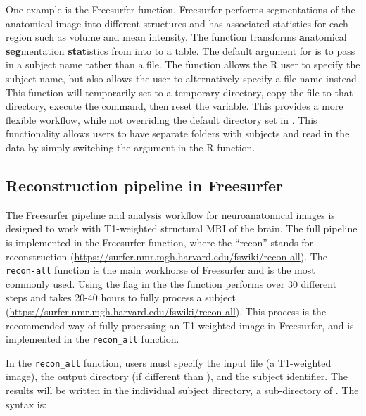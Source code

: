 One example is the  Freesurfer function.
Freesurfer performs segmentations of the anatomical image into different
structures and has associated statistics for each region such as volume
and mean intensity. The  function transforms
\textbf{a}natomical \textbf{seg}mentation \textbf{stat}istics from into
to a table. The default argument for  is to pass
in a subject name rather than a file. The 
 function allows the R user to specify the subject
name, but also allows the user to alternatively specify a file name
instead. This function will temporarily set  to a
temporary directory, copy the file to that directory, execute the
command, then reset the  variable. This provides a
more flexible workflow, while not overriding the default directory set
in . This functionality allows users to have
separate folders with subjects and read in the data by simply switching
the  argument in the R function.

\subsection{Reconstruction pipeline in
Freesurfer}\label{reconstruction-pipeline-in-freesurfer}

The Freesurfer pipeline and analysis workflow for neuroanatomical images
is designed to work with T1-weighted structural MRI of the brain. The
full pipeline is implemented in the Freesurfer 
function, where the ``recon'' stands for reconstruction
(\url{https://surfer.nmr.mgh.harvard.edu/fswiki/recon-all}). The
\texttt{recon-all} function is the main workhorse of Freesurfer and is
the most commonly used. Using the  flag in the the
 function performs over 30 different steps and takes
20-40 hours to fully process a subject
(\url{https://surfer.nmr.mgh.harvard.edu/fswiki/recon-all}). This
process is the recommended way of fully processing an T1-weighted image
in Freesurfer, and is implemented in the \texttt{recon\_all}
 function.

In the \texttt{recon\_all} function, users must specify the input file
(a T1-weighted image), the output directory (if different than
), and the subject identifier. The results will be
written in the individual subject directory, a sub-directory of
. The syntax is:

